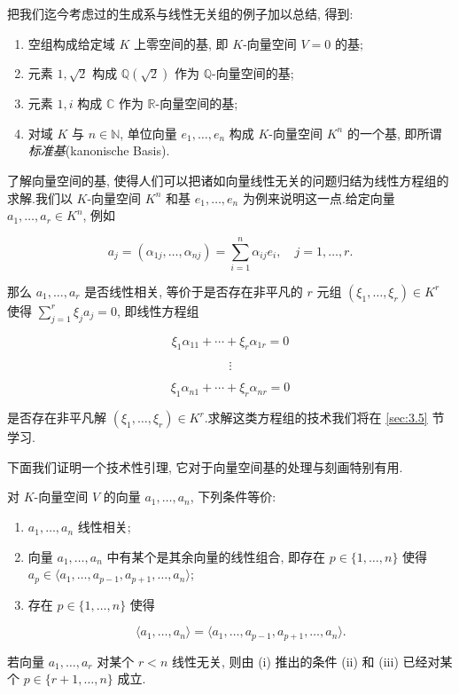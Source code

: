 把我们迄今考虑过的生成系与线性无关组的例子加以总结, 得到:
\begin{enumerate}
\item 空组构成给定域 $K$ 上零空间的基, 即 $K$-向量空间 $V = 0$ 的基;
\item 元素 $1, \sqrt{2}$ 构成 $\mathbb{Q}(\sqrt{2})$ 作为 $\mathbb{Q}$-向量空间的基;
\item 元素 $1, i$ 构成 $\mathbb{C}$ 作为 $\mathbb{R}$-向量空间的基;
\item 对域 $K$ 与 $n \in \mathbb{N}$, 单位向量 $e_1, \ldots, e_n$ 构成 $K$-向量空间 $K^n$ 的一个基, 即所谓\emph{标准基}(\textup{kanonische Basis}).
\end{enumerate}

了解向量空间的基, 使得人们可以把诸如向量线性无关的问题归结为线性方程组的求解.我们以 $K$-向量空间 $K^n$ 和基 $e_1, \ldots, e_n$ 为例来说明这一点.给定向量 $a_1, \ldots, a_r \in K^n$, 例如

\[
a_j = (\alpha_{1j}, \ldots, \alpha_{nj}) = \sum_{i = 1}^{n} \alpha_{ij} e_i, \quad j = 1, \ldots, r\text{.}
\]

那么 $a_1, \ldots, a_r$ 是否线性相关, 等价于是否存在非平凡的 $r$ 元组 $(\xi_1, \ldots, \xi_r) \in K^r$ 使得 $\sum_{j = 1}^{r} \xi_j a_j = 0$, 即线性方程组

\[
\xi_1 \alpha_{11} + \cdots + \xi_r \alpha_{1r} = 0
\]

\[
\vdots
\]

\[
\xi_1 \alpha_{n1} + \cdots + \xi_r \alpha_{nr} = 0
\]

是否存在非平凡解 $(\xi_1, \ldots, \xi_r) \in K^r$.求解这类方程组的技术我们将在 \ref{sec:3.5} 节学习.

下面我们证明一个技术性引理, 它对于向量空间基的处理与刻画特别有用.

\begin{lemma}[线性相关的刻画]\label{lem:1.5.5}
对 $K$-向量空间 $V$ 的向量 $a_1, \ldots, a_n$, 下列条件等价:
\begin{enumerate}
\item[(i)] $a_1, \ldots, a_n$ 线性相关;
\item[(ii)] 向量 $a_1, \ldots, a_n$ 中有某个是其余向量的线性组合, 即存在 $p \in \{1, \ldots, n\}$ 使得 $a_p \in \langle a_1, \ldots, a_{p-1},\allowbreak a_{p+1}, \ldots, a_n \rangle$;
\item[(iii)] 存在 $p \in \{1, \ldots, n\}$ 使得

\[
\langle a_1, \ldots, a_n \rangle = \langle a_1, \ldots, a_{p-1}, a_{p+1}, \ldots, a_n \rangle\text{.}
\]
\end{enumerate}
若向量 $a_1, \ldots, a_r$ 对某个 $r < n$ 线性无关, 则由 (i) 推出的条件 (ii) 和 (iii) 已经对某个 $p \in \{r + 1, \ldots, n\}$ 成立.
\end{lemma}

